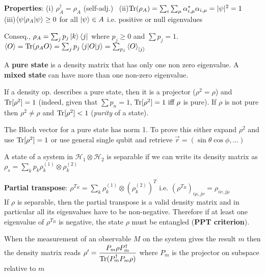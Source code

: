 \begin{squishlist}
    \item \textbf{Properties}: 
    (i) $\rho_A^{\dagger} = \rho_A$ (self-adj.) \, (ii)$\mathrm{Tr}(\rho_A) = \sum_i  \sum_{\mu}\alpha^*_{i,\mu}\alpha_{i,\mu} = |\psi|^2 = 1$ \\ (iii)$\braket{\psi|\rho_A|\psi} \geq 0$ for all $\ket{\psi} \in A$ i.e. positive or null eigenvalues
    \item Conseq., $\rho_A = \sum_j p_j \ket{k}\bra{j}$ where $p_j\geq 0$ and $\sum p_j = 1$.\\ $\braket{O} = \mathrm{Tr}(\rho_A O) = \sum_j p_j \braket{j|O|j} = \sum_{p_j} \braket{O}_{\ket{j}}$
    
    \item A \textbf{pure state} is a density matrix that has only one non zero eigenvalue. A \textbf{mixed state}
    can have more than one non-zero eigenvalue.
    \item If a density op. describes a pure state, then it is a projector ($\rho^2 = \rho$) and $\mathrm{Tr}[\rho^2] = 1$ (indeed, given that $\sum p_n = 1$, $\mathrm{Tr}[\rho^2] = 1 \text{ iff } \rho$ is pure). If $\rho$ is not pure then $\rho^2 \neq \rho$ and $\mathrm{Tr}[\rho^2] < 1$ (\emph{purity} of a state).

    \item The Bloch vector for a pure state has norm 1. To prove this either expand $\rho^2$ and use $\mathrm{Tr}[\rho^2] = 1$ or use general single qubit and retrieve $\vec{r} = (\sin \theta \cos \phi, \ldots)$
    
    \item A state of a system in $\mathcal{H}_1 \otimes \mathcal{H}_2$ is separable if we can write its density matrix as \\
    $\rho_s = \sum_k p_k \rho_k^{(1)} \otimes \rho_k^{(2)} $

    \item \textbf{Partial transpose}: $\rho^{T_B} = \sum_k \rho_k^{(1)} \otimes \left(\rho_k^{(2)}\right)^T$
    i.e. $(\rho^{T_B})_{i\mu,j\nu} = \rho_{i\nu,j\mu}$ \\
    If $\rho$ is separable, then the partial transpose is a valid density matrix and in particular all its eigenvalues have to be non-negative. Therefore if at least one eigenvalue of $\rho^{T_B}$ is negative, the state $\rho$ must be entangled (\textbf{PPT criterion}).

    \item When the measurement of an observable $M$ on the system gives the result $m$ then the density matrix reads $\rho' = \dfrac{P_m \rho P_m^{\dagger}}{\mathrm{Tr}(P_m^{\dagger}P_m \rho)}$ where $P_m$ is the projector on subspace relative to $m$


\end{squishlist}

